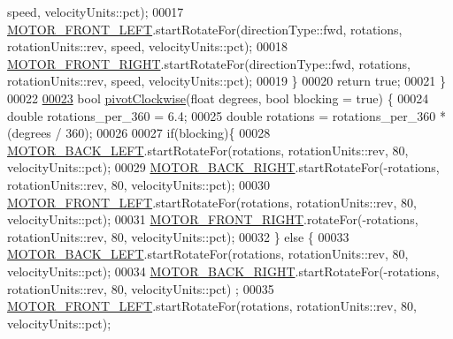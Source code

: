 \begin{DoxyCode}
      speed, velocityUnits::pct);
00017     \mbox{\hyperlink{declarations_8h_a8c6f6315caf1d81bf4d4d113d0f7bffc_a8c6f6315caf1d81bf4d4d113d0f7bffc}{MOTOR\_FRONT\_LEFT}}.startRotateFor(directionType::fwd, rotations, rotationUnits::rev, 
      speed, velocityUnits::pct);
00018     \mbox{\hyperlink{declarations_8h_ad6a9ea3d338421c5d709c32ae1aa42d8_ad6a9ea3d338421c5d709c32ae1aa42d8}{MOTOR\_FRONT\_RIGHT}}.startRotateFor(directionType::fwd, rotations, rotationUnits::rev, 
      speed, velocityUnits::pct);
00019   \}
00020   \textcolor{keywordflow}{return} \textcolor{keyword}{true};
00021 \}
00022 
\mbox{\hyperlink{auton_8cpp_a362446334157b1edf93062607b0f5e4c_a362446334157b1edf93062607b0f5e4c}{00023}} \textcolor{keywordtype}{bool} \mbox{\hyperlink{auton_8cpp_a362446334157b1edf93062607b0f5e4c_a362446334157b1edf93062607b0f5e4c}{pivotClockwise}}(\textcolor{keywordtype}{float} degrees, \textcolor{keywordtype}{bool} blocking = \textcolor{keyword}{true}) \{
00024   \textcolor{keywordtype}{double} rotations\_per\_360 = 6.4;
00025   \textcolor{keywordtype}{double} rotations = rotations\_per\_360 * (degrees / 360);
00026 
00027   \textcolor{keywordflow}{if}(blocking)\{
00028   \mbox{\hyperlink{declarations_8h_ab24214b642128d0f3cb67e9b12e7d4fb_ab24214b642128d0f3cb67e9b12e7d4fb}{MOTOR\_BACK\_LEFT}}.startRotateFor(rotations, rotationUnits::rev, 80, velocityUnits::pct);
00029   \mbox{\hyperlink{declarations_8h_adece81dedf91c2893ba42dc05135a575_adece81dedf91c2893ba42dc05135a575}{MOTOR\_BACK\_RIGHT}}.startRotateFor(-rotations, rotationUnits::rev, 80, velocityUnits::pct);
00030   \mbox{\hyperlink{declarations_8h_a8c6f6315caf1d81bf4d4d113d0f7bffc_a8c6f6315caf1d81bf4d4d113d0f7bffc}{MOTOR\_FRONT\_LEFT}}.startRotateFor(rotations, rotationUnits::rev, 80, velocityUnits::pct);
00031   \mbox{\hyperlink{declarations_8h_ad6a9ea3d338421c5d709c32ae1aa42d8_ad6a9ea3d338421c5d709c32ae1aa42d8}{MOTOR\_FRONT\_RIGHT}}.rotateFor(-rotations, rotationUnits::rev, 80, velocityUnits::pct);
00032   \} \textcolor{keywordflow}{else} \{
00033     \mbox{\hyperlink{declarations_8h_ab24214b642128d0f3cb67e9b12e7d4fb_ab24214b642128d0f3cb67e9b12e7d4fb}{MOTOR\_BACK\_LEFT}}.startRotateFor(rotations, rotationUnits::rev, 80, velocityUnits::pct);
00034     \mbox{\hyperlink{declarations_8h_adece81dedf91c2893ba42dc05135a575_adece81dedf91c2893ba42dc05135a575}{MOTOR\_BACK\_RIGHT}}.startRotateFor(-rotations, rotationUnits::rev, 80, velocityUnits::pct)
      ;
00035     \mbox{\hyperlink{declarations_8h_a8c6f6315caf1d81bf4d4d113d0f7bffc_a8c6f6315caf1d81bf4d4d113d0f7bffc}{MOTOR\_FRONT\_LEFT}}.startRotateFor(rotations, rotationUnits::rev, 80, velocityUnits::pct);

\end{DoxyCode}
